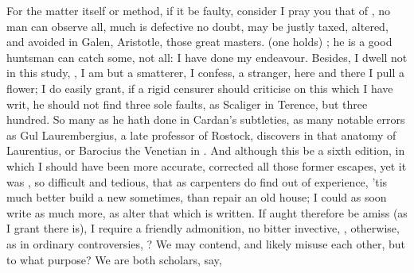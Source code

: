 For the matter itself or method, if it be faulty, consider I pray you that of
, no man
can observe all, much is defective no doubt, may be justly taxed, altered, and
avoided in Galen, Aristotle, those great masters. 
(one holds) ; he is a
good huntsman can catch some, not all: I have done my endeavour. Besides, I
dwell not in this study, , I am but a smatterer, I confess, a stranger,
here and there I pull a flower; I do easily grant, if a
rigid censurer should criticise on this which I have writ, he should not find
three sole faults, as Scaliger in Terence, but three hundred. So many as he
hath done in Cardan's subtleties, as many notable errors as
Gul Laurembergius, a late professor of Rostock, discovers
in that anatomy of Laurentius, or Barocius the Venetian in .
And although this be a sixth edition, in which I should have been more
accurate, corrected all those former escapes, yet it was , so difficult and tedious, that as carpenters do find out of experience,
'tis much better build a new sometimes, than repair an old house; I could as
soon write as much more, as alter that which is written. If aught therefore be
amiss (as I grant there is), I require a friendly admonition, no bitter
invective, , otherwise, as in ordinary controversies, ? We may contend, and likely misuse each other, but to
what purpose? We are both scholars, say,


